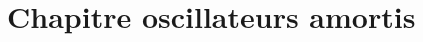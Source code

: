 \documentclass{article}
\begin{document}
\begin{comment}
\section{Chapitre sur l'oscillateur harmonique}

\hfil

\bk

\hfil


\section{Chapitre sur les ondes}

\hfil

\bk

\hfil

\bk

\hfil

\bk

\hfil

\bk
\end{comment}


\section{Chapitre oscillateurs amortis}

\hfil

\bk

\hfil

\bk

\hfil
\end{document}
